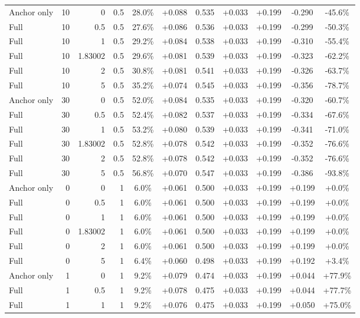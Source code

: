 \begin{table}[htbp]
\begin{tabular}{lrrrccccccc}
Anchor only & 10 & 0 & 0.5 & 28.0\% & +0.088 & 0.535 & +0.033 & +0.199 & -0.290 & -45.6\% \\
Full & 10 & 0.5 & 0.5 & 27.6\% & +0.086 & 0.536 & +0.033 & +0.199 & -0.299 & -50.3\% \\
Full & 10 & 1 & 0.5 & 29.2\% & +0.084 & 0.538 & +0.033 & +0.199 & -0.310 & -55.4\% \\
Full & 10 & 1.83002 & 0.5 & 29.6\% & +0.081 & 0.539 & +0.033 & +0.199 & -0.323 & -62.2\% \\
Full & 10 & 2 & 0.5 & 30.8\% & +0.081 & 0.541 & +0.033 & +0.199 & -0.326 & -63.7\% \\
Full & 10 & 5 & 0.5 & 35.2\% & +0.074 & 0.545 & +0.033 & +0.199 & -0.356 & -78.7\% \\
Anchor only & 30 & 0 & 0.5 & 52.0\% & +0.084 & 0.535 & +0.033 & +0.199 & -0.320 & -60.7\% \\
Full & 30 & 0.5 & 0.5 & 52.4\% & +0.082 & 0.537 & +0.033 & +0.199 & -0.334 & -67.6\% \\
Full & 30 & 1 & 0.5 & 53.2\% & +0.080 & 0.539 & +0.033 & +0.199 & -0.341 & -71.0\% \\
Full & 30 & 1.83002 & 0.5 & 52.8\% & +0.078 & 0.542 & +0.033 & +0.199 & -0.352 & -76.6\% \\
Full & 30 & 2 & 0.5 & 52.8\% & +0.078 & 0.542 & +0.033 & +0.199 & -0.352 & -76.6\% \\
Full & 30 & 5 & 0.5 & 56.8\% & +0.070 & 0.547 & +0.033 & +0.199 & -0.386 & -93.8\% \\
Anchor only & 0 & 0 & 1 & 6.0\% & +0.061 & 0.500 & +0.033 & +0.199 & +0.199 & +0.0\% \\
Full & 0 & 0.5 & 1 & 6.0\% & +0.061 & 0.500 & +0.033 & +0.199 & +0.199 & +0.0\% \\
Full & 0 & 1 & 1 & 6.0\% & +0.061 & 0.500 & +0.033 & +0.199 & +0.199 & +0.0\% \\
Full & 0 & 1.83002 & 1 & 6.0\% & +0.061 & 0.500 & +0.033 & +0.199 & +0.199 & +0.0\% \\
Full & 0 & 2 & 1 & 6.0\% & +0.061 & 0.500 & +0.033 & +0.199 & +0.199 & +0.0\% \\
Full & 0 & 5 & 1 & 6.4\% & +0.060 & 0.498 & +0.033 & +0.199 & +0.192 & +3.4\% \\
Anchor only & 1 & 0 & 1 & 9.2\% & +0.079 & 0.474 & +0.033 & +0.199 & +0.044 & +77.9\% \\
Full & 1 & 0.5 & 1 & 9.2\% & +0.078 & 0.475 & +0.033 & +0.199 & +0.044 & +77.7\% \\
Full & 1 & 1 & 1 & 9.2\% & +0.076 & 0.475 & +0.033 & +0.199 & +0.050 & +75.0\% \\

\end{tabular}
\end{table}
